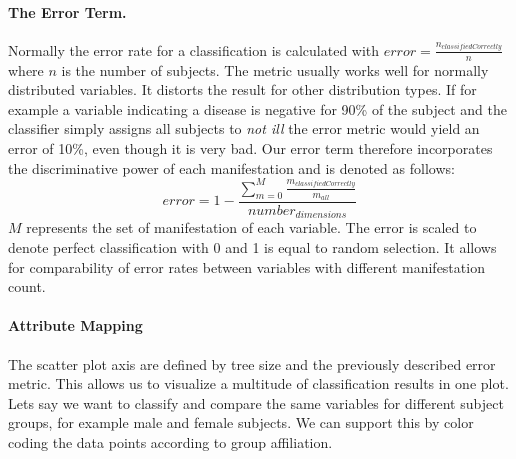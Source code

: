 \documentclass[a4paper,twoside]{style/article}
\begin{document}
\paragraph{The Error Term. }
Normally the error rate for a classification is calculated with $error = \frac{n_{classifiedCorrectly}} {n}$ where $n$ is the number of subjects.
The metric usually works well for normally distributed variables.
It distorts the result for other distribution types.
If for example a variable indicating a disease is negative for 90\% of the subject and the classifier simply assigns all subjects to \emph{not ill} the error metric would yield an error of 10\%, even though it is very bad.
Our error term therefore incorporates the discriminative power of each manifestation and is denoted as follows:
\begin{equation}
error = 1 - \frac{\sum_{m=0}^M \frac{m_{classifiedCorrectly}}{m_{all}}}{number_{dimensions}}
\end{equation}
$M$ represents the set of manifestation of each variable.
The error is scaled to denote perfect classification with 0 and 1 is equal to random selection.
It allows for comparability of error rates between variables with different manifestation count.

\paragraph{Attribute Mapping}
The scatter plot axis are defined by tree size and the previously described error metric.
This allows us to visualize a multitude of classification results in one plot.
Lets say we want to classify and compare the same variables for different subject groups, for example male and female subjects.
We can support this by color coding the data points according to group affiliation.
\end{document}
